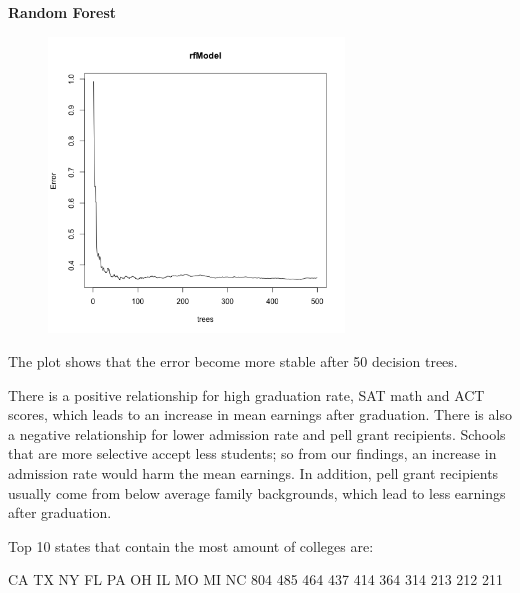 \documentclass{article}
\begin{document}
\clearpage

\textbf{Random Forest}\newline

\begin{figure}[H]
\includegraphics[width=0.7\textwidth]{../images/rf_top.png}
\end{figure}
The plot shows that the error become more stable after 50 decision trees.


There is a positive relationship for high graduation rate, SAT math and ACT scores, which leads to an increase in mean earnings after graduation.  There is also a negative relationship for lower admission rate and pell grant recipients.  Schools that are more selective accept less students; so from our findings, an increase in admission rate would harm the mean earnings.  In addition, pell grant recipients usually come from below average family backgrounds, which lead to less earnings after graduation. 

\clearpage
Top 10 states that contain the most amount of colleges are:
\begin{Schunk}
\begin{Soutput}
 CA  TX  NY  FL  PA  OH  IL  MO  MI  NC 
804 485 464 437 414 364 314 213 212 211 
\end{Soutput}
\end{Schunk}
\end{document}
